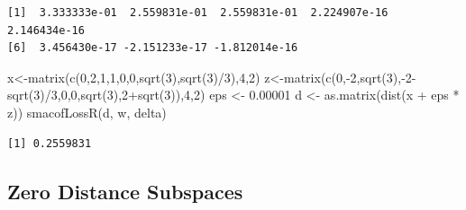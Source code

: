 \documentclass[
  12pt,
  letterpaper,
  DIV=11,
  numbers=noendperiod]{scrreprt}
\newenvironment{Shaded}{\begin{snugshade}}{\end{snugshade}}
\newcommand{\DecValTok}[1]{\textcolor[rgb]{0.68,0.00,0.00}{#1}}
\newcommand{\FloatTok}[1]{\textcolor[rgb]{0.68,0.00,0.00}{#1}}
\newcommand{\FunctionTok}[1]{\textcolor[rgb]{0.28,0.35,0.67}{#1}}
\newcommand{\NormalTok}[1]{\textcolor[rgb]{0.00,0.23,0.31}{#1}}
\newcommand{\OtherTok}[1]{\textcolor[rgb]{0.00,0.23,0.31}{#1}}
\newcommand{\SpecialCharTok}[1]{\textcolor[rgb]{0.37,0.37,0.37}{#1}}
\theoremstyle{remark}
\begin{document}
\begin{Shaded}
\end{Shaded}

\begin{verbatim}
[1]  3.333333e-01  2.559831e-01  2.559831e-01  2.224907e-16  2.146434e-16
[6]  3.456430e-17 -2.151233e-17 -1.812014e-16
\end{verbatim}

\begin{Shaded}
\begin{Highlighting}[]
\NormalTok{x}\OtherTok{\textless{}{-}}\FunctionTok{matrix}\NormalTok{(}\FunctionTok{c}\NormalTok{(}\DecValTok{0}\NormalTok{,}\DecValTok{2}\NormalTok{,}\DecValTok{1}\NormalTok{,}\DecValTok{1}\NormalTok{,}\DecValTok{0}\NormalTok{,}\DecValTok{0}\NormalTok{,}\FunctionTok{sqrt}\NormalTok{(}\DecValTok{3}\NormalTok{),}\FunctionTok{sqrt}\NormalTok{(}\DecValTok{3}\NormalTok{)}\SpecialCharTok{/}\DecValTok{3}\NormalTok{),}\DecValTok{4}\NormalTok{,}\DecValTok{2}\NormalTok{)}
\NormalTok{z}\OtherTok{\textless{}{-}}\FunctionTok{matrix}\NormalTok{(}\FunctionTok{c}\NormalTok{(}\DecValTok{0}\NormalTok{,}\SpecialCharTok{{-}}\DecValTok{2}\NormalTok{,}\FunctionTok{sqrt}\NormalTok{(}\DecValTok{3}\NormalTok{),}\SpecialCharTok{{-}}\DecValTok{2}\SpecialCharTok{{-}}\FunctionTok{sqrt}\NormalTok{(}\DecValTok{3}\NormalTok{)}\SpecialCharTok{/}\DecValTok{3}\NormalTok{,}\DecValTok{0}\NormalTok{,}\DecValTok{0}\NormalTok{,}\FunctionTok{sqrt}\NormalTok{(}\DecValTok{3}\NormalTok{),}\DecValTok{2}\SpecialCharTok{+}\FunctionTok{sqrt}\NormalTok{(}\DecValTok{3}\NormalTok{)),}\DecValTok{4}\NormalTok{,}\DecValTok{2}\NormalTok{)}
\NormalTok{eps }\OtherTok{\textless{}{-}} \FloatTok{0.00001}
\NormalTok{d }\OtherTok{\textless{}{-}} \FunctionTok{as.matrix}\NormalTok{(}\FunctionTok{dist}\NormalTok{(x }\SpecialCharTok{+}\NormalTok{ eps }\SpecialCharTok{*}\NormalTok{ z))}
\FunctionTok{smacofLossR}\NormalTok{(d, w, delta) }
\end{Highlighting}
\end{Shaded}

\begin{verbatim}
[1] 0.2559831
\end{verbatim}

\subsection{Zero Distance Subspaces}\label{propzerodist}
\end{document}
